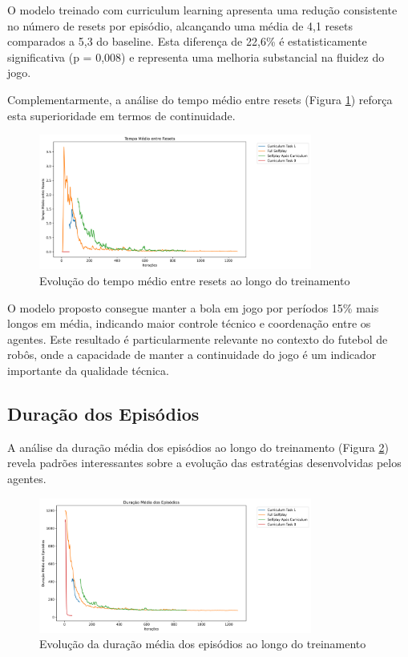 O modelo treinado com curriculum learning apresenta uma redução consistente no número de resets por episódio, alcançando uma média de 4,1 resets comparados a 5,3 do baseline. Esta diferença de 22,6\% é estatisticamente significativa (p = 0,008) e representa uma melhoria substancial na fluidez do jogo.

Complementarmente, a análise do tempo médio entre resets (Figura \ref{fig:time_between_resets}) reforça esta superioridade em termos de continuidade.

\begin{figure}[H]
    \centering
    \includegraphics[width=0.8\textwidth]{fig/graficos_trabalho/graficos_experimentos/geral/custom_metricsavg_time_between_resets_mean.png}
    \caption{Evolução do tempo médio entre resets ao longo do treinamento}
    \label{fig:time_between_resets}
\end{figure}

O modelo proposto consegue manter a bola em jogo por períodos 15\% mais longos em média, indicando maior controle técnico e coordenação entre os agentes. Este resultado é particularmente relevante no contexto do futebol de robôs, onde a capacidade de manter a continuidade do jogo é um indicador importante da qualidade técnica.

\subsection{Duração dos Episódios}

A análise da duração média dos episódios ao longo do treinamento (Figura \ref{fig:episode_len}) revela padrões interessantes sobre a evolução das estratégias desenvolvidas pelos agentes.

\begin{figure}[H]
    \centering
    \includegraphics[width=0.8\textwidth]{fig/graficos_trabalho/graficos_experimentos/geral/episode_len_mean.png}
    \caption{Evolução da duração média dos episódios ao longo do treinamento}
    \label{fig:episode_len}
\end{figure}

